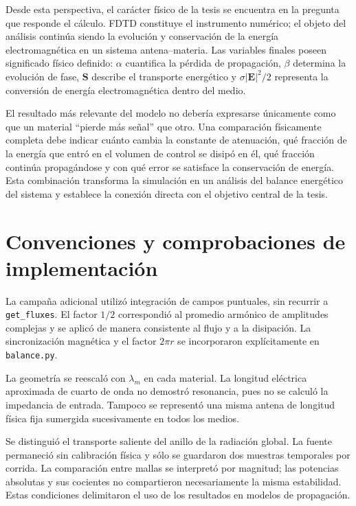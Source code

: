 Desde esta perspectiva, el carácter físico de la tesis se encuentra en la pregunta que responde el cálculo. FDTD constituye el instrumento numérico; el objeto del análisis continúa siendo la evolución y conservación de la energía electromagnética en un sistema antena--materia. Las variables finales poseen significado físico definido: $\alpha$ cuantifica la pérdida de propagación, $\beta$ determina la evolución de fase, $\mathbf{S}$ describe el transporte energético y $\sigma|\mathbf{E}|^2/2$ representa la conversión de energía electromagnética dentro del medio.

El resultado más relevante del modelo no debería expresarse únicamente como que un material ``pierde más señal'' que otro. Una comparación físicamente completa debe indicar cuánto cambia la constante de atenuación, qué fracción de la energía que entró en el volumen de control se disipó en él, qué fracción continúa propagándose y con qué error se satisface la conservación de energía. Esta combinación transforma la simulación en un análisis del balance energético del sistema y establece la conexión directa con el objetivo central de la tesis.

\section{Convenciones y comprobaciones de implementación}
La campaña adicional utilizó integración de campos puntuales, sin recurrir a \texttt{get\_fluxes}. El factor $1/2$ correspondió al promedio armónico de amplitudes complejas y se aplicó de manera consistente al flujo y a la disipación. La sincronización magnética y el factor $2\pi r$ se incorporaron explícitamente en \texttt{balance.py}.

La geometría se reescaló con $\lambda_m$ en cada material. La longitud eléctrica aproximada de cuarto de onda no demostró resonancia, pues no se calculó la impedancia de entrada. Tampoco se representó una misma antena de longitud física fija sumergida sucesivamente en todos los medios.

Se distinguió el transporte saliente del anillo de la radiación global. La fuente permaneció sin calibración física y sólo se guardaron dos muestras temporales por corrida. La comparación entre mallas se interpretó por magnitud; las potencias absolutas y sus cocientes no compartieron necesariamente la misma estabilidad. Estas condiciones delimitaron el uso de los resultados en modelos de propagación.
